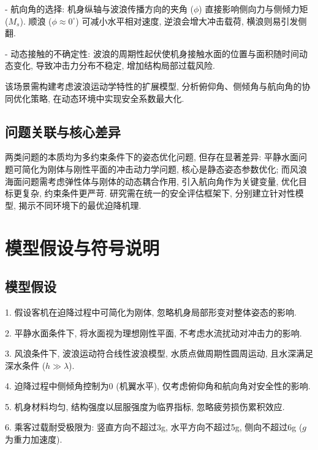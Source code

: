 \documentclass{cumcmthesis}
\begin{document}
- 航向角的选择: 机身纵轴与波浪传播方向的夹角 ($\phi$) 直接影响侧向力与侧倾力矩 ($M_s$). 顺浪 ($\phi \approx 0^\circ$) 可减小水平相对速度, 逆浪会增大冲击载荷, 横浪则易引发侧翻.

- 动态接触的不确定性: 波浪的周期性起伏使机身接触水面的位置与面积随时间动态变化, 导致冲击力分布不稳定, 增加结构局部过载风险.

该场景需构建考虑波浪运动学特性的扩展模型, 分析俯仰角、侧倾角与航向角的协同优化策略, 在动态环境中实现安全系数最大化.

\subsection{问题关联与核心差异}

两类问题的本质均为多约束条件下的姿态优化问题, 但存在显著差异: 平静水面问题可简化为刚体与刚性平面的冲击动力学问题, 核心是静态姿态参数优化; 而风浪海面问题需考虑弹性体与刚体的动态耦合作用, 引入航向角作为关键变量, 优化目标更复杂, 约束条件更严苛. 研究需在统一的安全评估框架下, 分别建立针对性模型, 揭示不同环境下的最优迫降机理. 
    
\section{模型假设与符号说明}
\subsection{模型假设}
1. 假设客机在迫降过程中可简化为刚体, 忽略机身局部形变对整体姿态的影响. 

2. 平静水面条件下, 将水面视为理想刚性平面, 不考虑水流扰动对冲击力的影响. 

3. 风浪条件下, 波浪运动符合线性波浪模型, 水质点做周期性圆周运动, 且水深满足深水条件 (\( h \gg \lambda \)). 

4. 迫降过程中侧倾角控制为0 (机翼水平), 仅考虑俯仰角和航向角对安全性的影响. 

5. 机身材料均匀, 结构强度以屈服强度为临界指标, 忽略疲劳损伤累积效应. 

6. 乘客过载耐受极限为: 竖直方向不超过3g, 水平方向不超过5g, 侧向不超过6g (\( g \)为重力加速度). 
\end{document}
